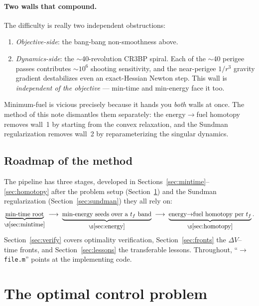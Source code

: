 \documentclass[11pt]{article}
\newcommand{\file}[1]{\texttt{\small #1}}
\begin{document}
\paragraph{Two walls that compound.} The difficulty is really two independent
obstructions:
\begin{enumerate}
  \item \emph{Objective-side}: the bang-bang non-smoothness above.
  \item \emph{Dynamics-side}: the $\sim$40-revolution CR3BP spiral. Each of the
        $\sim$40 perigee passes contributes $\sim\!10^6$ shooting sensitivity,
        and the near-perigee $1/r^3$ gravity gradient destabilizes even an
        exact-Hessian Newton step. This wall is \emph{independent of the
        objective} --- min-time and min-energy face it too.
\end{enumerate}
Minimum-fuel is vicious precisely because it hands you \emph{both} walls at
once. The method of this note dismantles them separately: the
energy$\rightarrow$fuel homotopy removes wall~1 by starting from the convex
relaxation, and the Sundman regularization removes wall~2 by reparameterizing
the singular dynamics.

\subsection{Roadmap of the method}
The pipeline has three stages, developed in Sections~\ref{sec:mintime}--%
\ref{sec:homotopy} after the problem setup (Section~\ref{sec:ocp}) and the
Sundman regularization (Section~\ref{sec:sundman}) they all rely on:
\[
\underbrace{\text{min-time root}}_{\S\ref{sec:mintime}}
\;\longrightarrow\;
\underbrace{\text{min-energy seeds over a $t_f$ band}}_{\S\ref{sec:energy}}
\;\longrightarrow\;
\underbrace{\text{energy$\to$fuel homotopy per $t_f$}}_{\S\ref{sec:homotopy}} .
\]
Section~\ref{sec:verify} covers optimality verification, Section~\ref{sec:fronts}
the $\Delta V$--time fronts, and Section~\ref{sec:lessons} the transferable
lessons. Throughout, ``$\rightarrow$ \file{file.m}'' points at the implementing
code.

\section{The optimal control problem}\label{sec:ocp}
\end{document}
